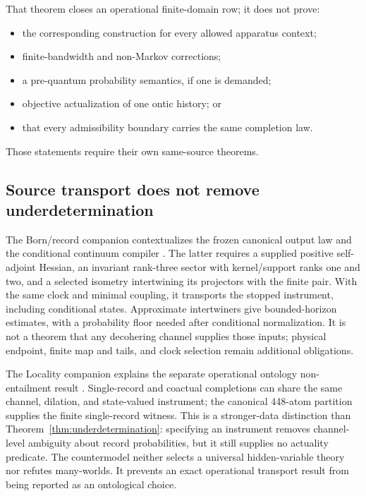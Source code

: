 \documentclass[11pt]{article}
\begin{document}
That theorem closes an operational finite-domain row; it does not prove:
\begin{itemize}
\item the corresponding construction for every allowed apparatus context;
\item finite-bandwidth and non-Markov corrections;
\item a pre-quantum probability semantics, if one is demanded;
\item objective actualization of one ontic history; or
\item that every admissibility boundary carries the same completion law.
\end{itemize}
Those statements require their own same-source theorems.

\subsection{Source transport does not remove underdetermination}
\label{sec:recorder-source-interface}
The Born/record companion contextualizes the frozen canonical output law and
the conditional continuum compiler
\cite{BornCompanion,FrozenFock,FrozenContinuum}. The latter requires a
supplied positive self-adjoint Hessian, an invariant rank-three sector with
kernel/support ranks one and two, and a selected isometry intertwining its
projectors with the finite pair. With the same clock and minimal coupling,
it transports the stopped instrument, including conditional states.
Approximate intertwiners give bounded-horizon estimates, with a probability
floor needed after conditional normalization. It is not a theorem that any
decohering channel supplies those inputs; physical endpoint, finite map and
tails, and clock selection remain additional obligations.

The Locality companion explains the separate operational ontology
non-entailment result \cite{LocalityCompanion,FrozenOntology}. Single-record
and coactual completions can share the same channel, dilation, and
state-valued instrument; the canonical 448-atom partition supplies the
finite single-record witness. This is a stronger-data distinction than
Theorem~\ref{thm:underdetermination}: specifying an instrument removes
channel-level ambiguity about record probabilities, but it still supplies
no actuality predicate. The countermodel neither selects a universal
hidden-variable theory nor refutes many-worlds. It prevents an exact
operational transport result from being reported as an ontological choice.
\end{document}
